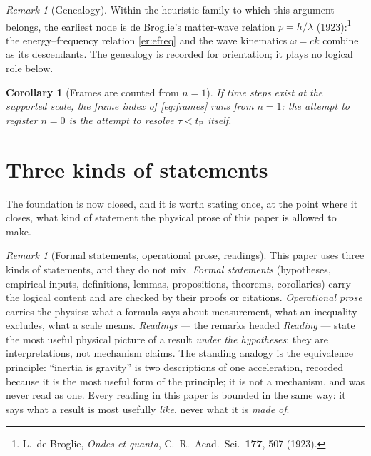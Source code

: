 \documentclass[11pt]{amsbook}
\theoremstyle{plain}
\newtheorem{corollary}[theorem]{Corollary}
\theoremstyle{definition}
\theoremstyle{remark}
\newtheorem{remark}[theorem]{Remark}
\newcommand{\uses}[1]{\par\nopagebreak\noindent{\footnotesize\emph{Uses: #1.}\par}}
\begin{document}
\begin{remark}[Genealogy]\label{rem:genealogy}
Within the heuristic family to which this argument belongs, the earliest node is de Broglie's matter-wave relation $p = h/\lambda$ (1923):\footnote{L.~de Broglie, \emph{Ondes et quanta}, C.\ R.\ Acad.\ Sci.\ \textbf{177}, 507 (1923).} the energy--frequency relation \cref{er:efreq} and the wave kinematics $\omega = ck$ combine as its descendants. The genealogy is recorded for orientation; it plays no logical role below.
\end{remark}

\begin{corollary}[Frames are counted from $n = 1$]\label{cor:counting}
If time steps exist at the supported scale, the frame index of \cref{eq:frames} runs from $n = 1$: the attempt to register $n = 0$ is the attempt to resolve $\tau < t_{\mathrm P}$ itself.
\uses{\cref{prop:tau}, \cref{as:a1}}
\end{corollary}

\section{Three kinds of statements}\label{sec:interpretation}

The foundation is now closed, and it is worth stating once, at the point where it closes, what kind of statement the physical prose of this paper is allowed to make.

\begin{remark}[Formal statements, operational prose, readings]\label{rem:register}
This paper uses three kinds of statements, and they do not mix. \emph{Formal statements} (hypotheses, empirical inputs, definitions, lemmas, propositions, theorems, corollaries) carry the logical content and are checked by their proofs or citations. \emph{Operational prose} carries the physics: what a formula says about measurement, what an inequality excludes, what a scale means. \emph{Readings} --- the remarks headed \emph{Reading} --- state the most useful physical picture of a result \emph{under the hypotheses}; they are interpretations, not mechanism claims. The standing analogy is the equivalence principle: ``inertia is gravity'' is two descriptions of one acceleration, recorded because it is the most useful form of the principle; it is not a mechanism, and was never read as one. Every reading in this paper is bounded in the same way: it says what a result is most usefully \emph{like}, never what it is \emph{made of}.
\end{remark}
\end{document}
